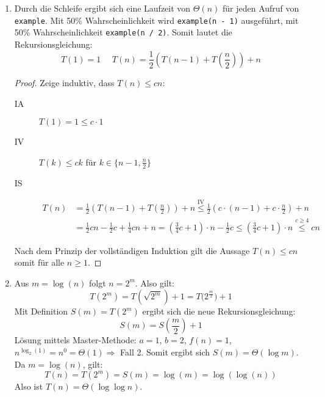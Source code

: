 \documentclass[11pt,a4paper]{article}
\begin{document}
\begin{loesung}
\begin{enumerate}
    \item
    Durch die Schleife ergibt sich eine Laufzeit von $\Theta(n)$ für jeden Aufruf von \texttt{example}.
    Mit 50\% Wahrscheinlichkeit wird \texttt{example(n - 1)} ausgeführt, mit 50\% Wahrscheinlichkeit \texttt{example(n / 2)}.
    Somit lautet die Rekursionsgleichung:
    \begin{equation*}
        T(1) = 1 \,\,\,\,\,\,\,\, T(n) = \frac{1}{2}\left(T(n - 1) + T\left(\frac{n}{2}\right)\right) + n
    \end{equation*}
    \begin{proof}
        Zeige induktiv, dass $T(n) \leq cn$:
        \begin{description}
            \item[IA] $T(1) = 1 \leq c \cdot 1$
            \item[IV] $T(k) \leq ck$ für $k \in \{n - 1, \frac{n}{2}\}$
            \item[IS]
            \begin{align*}
                T(n) &= \frac{1}{2}\left(T(n - 1) + T\left(\frac{n}{2}\right)\right) + n
                \overset{\text{IV}}{\leq} \frac{1}{2}\left(c \cdot (n - 1) + c \cdot \frac{n}{2} \right) + n \\
                &=\frac{1}{2} cn - \frac{1}{2} c + \frac{1}{4} cn + n
                = \left(\frac{3}{4} c + 1\right) \cdot n - \frac{1}{2} c
                \leq \left(\frac{3}{4} c + 1\right) \cdot n
                \overset{c \geq 4}{\leq} cn
            \end{align*} 
        \end{description}
        Nach dem Prinzip der vollständigen Induktion gilt die Aussage $T(n) \leq cn$ somit für alle $n \geq 1$.
    \end{proof}
    \item 
    Aus $m = \log(n)$ folgt $n = 2^m$. Also gilt:
    \begin{equation*}
        T(2^m) = T\left(\sqrt{2^{m}}\right) + 1 = T\big(2^{\frac{m}{2}}\big) + 1
    \end{equation*}
    Mit Definition $S(m) = T(2^m)$ ergibt sich die neue Rekursionsgleichung:
    \begin{equation*}
        S(m) = S\left(\frac{m}{2}\right) + 1
    \end{equation*}
    Lösung mittels Master-Methode: $a = 1$, $b = 2$, $f(n) = 1$, $n^{\log_2(1)} = n^0 = \Theta(1) \Rightarrow$ Fall 2.
    Somit ergibt sich $S(m) = \Theta(\log m)$.
    Da $m = \log(n)$, gilt:
    \begin{equation*}
        T(n) = T(2^m) = S(m) = \log(m) = \log(\log(n))
    \end{equation*}
    Also ist $T(n) = \Theta(\log \log n)$.
\end{enumerate}
\end{loesung}
\end{document}
